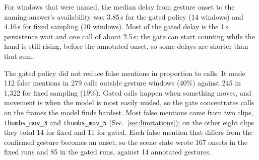 For windows that were named, the median delay from gesture onset to the naming answer's availability was 3.85\,s for the gated policy (14 windows) and 4.16\,s for fixed sampling (10 windows).
Most of the gated delay is the 1\,s persistence wait and one call of about 2.5\,s; the gate can start counting while the hand is still rising, before the annotated onset, so some delays are shorter than that sum.

The gated policy did not reduce false mentions in proportion to calls.
It made 112 false mentions in 279 calls outside gesture windows (40\%) against 245 in 1,322 for fixed sampling (19\%).
Gated calls happen when something moves, and movement is when the model is most easily misled, so the gate concentrates calls on the frames the model finds hardest.
Most false mentions come from two clips, \texttt{thumbs\_mov\_3} and \texttt{thumbs\_mov\_5} (Sec.~\ref{sec:limitations}); on the other eight clips they total 14 for fixed and 11 for gated.
Each false mention that differs from the confirmed gesture becomes an onset, so the scene state wrote 167 onsets in the fixed runs and 85 in the gated runs, against 14 annotated gestures.


